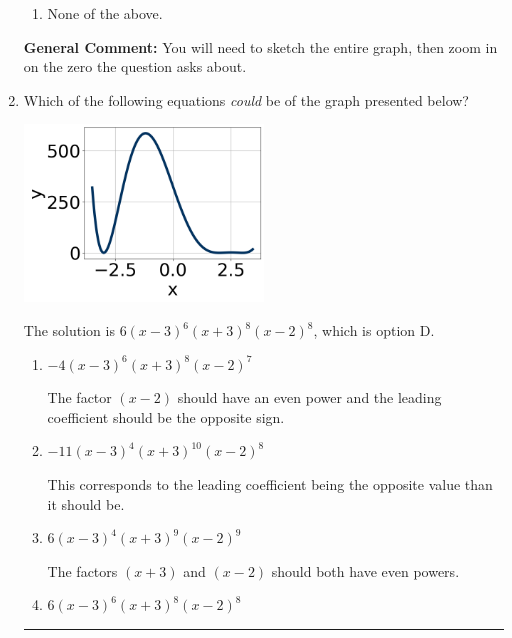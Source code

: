 \documentclass{extbook}[14pt]
\newcommand{\litem}[1]{\item #1

\rule{\textwidth}{0.4pt}}
\begin{document}
\begin{enumerate}
{\begin{enumerate}[label=\Alph*.]
\item None of the above.\end{enumerate}
\textbf{General Comment:} You will need to sketch the entire graph, then zoom in on the zero the question asks about.
}
\litem{
Which of the following equations \textit{could} be of the graph presented below?

\begin{center}
    \includegraphics[width=0.5\textwidth]{../Figures/polyGraphToFunctionB.png}
\end{center}


The solution is \( 6(x - 3)^{6} (x + 3)^{8} (x - 2)^{8} \), which is option D.\begin{enumerate}[label=\Alph*.]
\item \( -4(x - 3)^{6} (x + 3)^{8} (x - 2)^{7} \)

The factor $(x - 2)$ should have an even power and the leading coefficient should be the opposite sign.
\item \( -11(x - 3)^{4} (x + 3)^{10} (x - 2)^{8} \)

This corresponds to the leading coefficient being the opposite value than it should be.
\item \( 6(x - 3)^{4} (x + 3)^{9} (x - 2)^{9} \)

The factors $(x + 3)$ and $(x - 2)$ should both have even powers.
\item \( 6(x - 3)^{6} (x + 3)^{8} (x - 2)^{8} \)


\end{enumerate}}
\end{enumerate}
\end{document}

